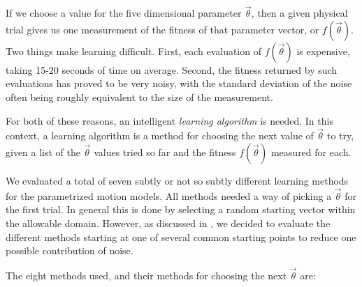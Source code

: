 If we choose a value for the five dimensional parameter
$\vec{\theta}$, then a given physical trial gives us one measurement
of the fitness of that parameter vector, or $f(\vec{\theta})$.  Two
things make learning difficult.  First, each evaluation of
$f(\vec{\theta})$ is expensive, taking 15-20 seconds of time on
average.  Second, the fitness returned by such evaluations has proved
to be very noisy, with the standard deviation of the noise often being
roughly equivalent to the size of the measurement.

For both of these reasons, an intelligent \emph{learning algorithm} is
needed.
In this context, a learning algorithm is a method for choosing
the next value of $\vec{\theta}$ to try, given a list of the
$\vec{\theta}$ values tried so far and the fitness $f(\vec{\theta})$
measured for each.

We evaluated a total of seven subtly or not so subtly different
learning methods for the parametrized motion models.  All methods
needed a way of picking a $\vec{\theta}$ for the first trial.  In
general this is done by selecting a random starting vector within the
allowable domain.  However, as discussed in
, we decided to evaluate the different
methods starting at one of several common starting points to reduce
one possible contribution of noise.


The eight methods used, and their methods for choosing the next
$\vec{\theta}$ are:








